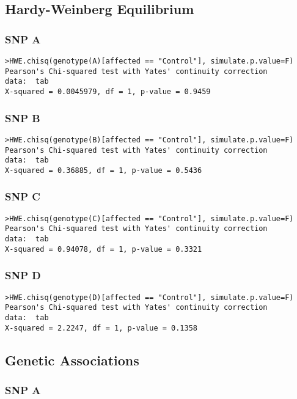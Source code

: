 \documentclass[11 pt,letterpaper]{article}
\begin{document}
    \subsection{Hardy-Weinberg Equilibrium}
        \subsubsection{SNP A}
    \begin{lstlisting}
>HWE.chisq(genotype(A)[affected == "Control"], simulate.p.value=F)
Pearson's Chi-squared test with Yates' continuity correction
data:  tab
X-squared = 0.0045979, df = 1, p-value = 0.9459
    \end{lstlisting}
        \subsubsection{SNP B}
        \begin{lstlisting}
>HWE.chisq(genotype(B)[affected == "Control"], simulate.p.value=F)
Pearson's Chi-squared test with Yates' continuity correction
data:  tab
X-squared = 0.36885, df = 1, p-value = 0.5436
    \end{lstlisting}
        \subsubsection{SNP C}
        \begin{lstlisting}
>HWE.chisq(genotype(C)[affected == "Control"], simulate.p.value=F)
Pearson's Chi-squared test with Yates' continuity correction
data:  tab
X-squared = 0.94078, df = 1, p-value = 0.3321
    \end{lstlisting}
        \subsubsection{SNP D}
        \begin{lstlisting}
>HWE.chisq(genotype(D)[affected == "Control"], simulate.p.value=F)
Pearson's Chi-squared test with Yates' continuity correction
data:  tab
X-squared = 2.2247, df = 1, p-value = 0.1358
    \end{lstlisting}

    \subsection{Genetic Associations}
        \subsubsection{SNP A}
\end{document}
